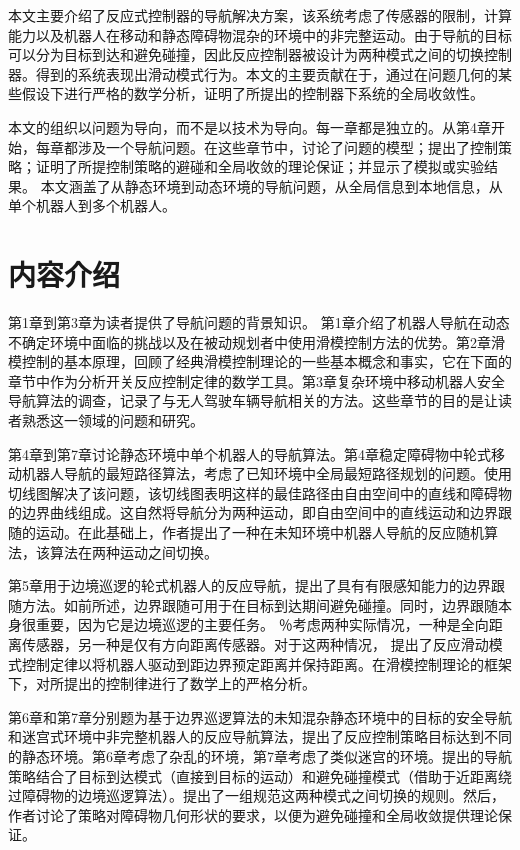 本文主要介绍了反应式控制器的导航解决方案，该系统考虑了传感器的限制，计算能力以及机器人在移动和静态障碍物混杂的环境中的非完整运动。由于导航的目标可以分为目标到达和避免碰撞，因此反应控制器被设计为两种模式之间的切换控制器。得到的系统表现出滑动模式行为。本文的主要贡献在于，通过在问题几何的某些假设下进行严格的数学分析，证明了所提出的控制器下系统的全局收敛性。

本文的组织以问题为导向，而不是以技术为导向。每一章都是独立的。从第4章开始，每章都涉及一个导航问题。在这些章节中，讨论了问题的模型；提出了控制策略；证明了所提控制策略的避碰和全局收敛的理论保证；并显示了模拟或实验结果。
本文涵盖了从静态环境到动态环境的导航问题，从全局信息到本地信息，从单个机器人到多个机器人。

\section{内容介绍}
第1章到第3章为读者提供了导航问题的背景知识。
第1章介绍了机器人导航在动态不确定环境中面临的挑战以及在被动规划者中使用滑模控制方法的优势。第2章滑模控制的基本原理，回顾了经典滑模控制理论的一些基本概念和事实，它在下面的章节中作为分析开关反应控制定律的数学工具。第3章复杂环境中移动机器人安全导航算法的调查，记录了与无人驾驶车辆导航相关的方法。这些章节的目的是让读者熟悉这一领域的问题和研究。

第4章到第7章讨论静态环境中单个机器人的导航算法。第4章稳定障碍物中轮式移动机器人导航的最短路径算法，考虑了已知环境中全局最短路径规划的问题。使用切线图解决了该问题，该切线图表明这样的最佳路径由自由空间中的直线和障碍物的边界曲线组成。这自然将导航分为两种运动，即自由空间中的直线运动和边界跟随的运动。在此基础上，作者提出了一种在未知环境中机器人导航的反应随机算法，该算法在两种运动之间切换。

第5章用于边境巡逻的轮式机器人的反应导航，提出了具有有限感知能力的边界跟随方法。如前所述，边界跟随可用于在目标到达期间避免碰撞。同时，边界跟随本身很重要，因为它是边境巡逻的主要任务。 ％考虑两种实际情况，一种是全向距离传感器，另一种是仅有方向距离传感器。对于这两种情况，
提出了反应滑动模式控制定律以将机器人驱动到距边界预定距离并保持距离。在滑模控制理论的框架下，对所提出的控制律进行了数学上的严格分析。

第6章和第7章分别题为基于边界巡逻算法的未知混杂静态环境中的目标的安全导航和迷宫式环境中非完整机器人的反应导航算法，提出了反应控制策略目标达到不同的静态环境。第6章考虑了杂乱的环境，第7章考虑了类似迷宫的环境。提出的导航策略结合了目标到达模式（直接到目标的运动）和避免碰撞模式（借助于近距离绕过障碍物的边境巡逻算法）。提出了一组规范这两种模式之间切换的规则。然后，作者讨论了策略对障碍物几何形状的要求，以便为避免碰撞和全局收敛提供理论保证。

